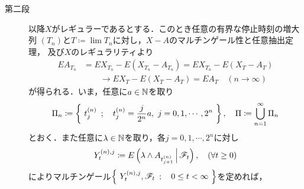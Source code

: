 \begin{prf}
\begin{description}
			\item[第二段]
				以降$X$がレギュラーであるとする．このとき任意の有界な停止時刻の増大列
				$(T_n)$と$T \coloneqq \lim T_n$に対し，$X-A$のマルチンゲール性と任意抽出定理，
				及び$X$のレギュラリティより
				\begin{align}
					EA_{T_n} &= EX_{T_n} - E(X_{T_n} - A_{T_n})
					= EX_{T_n} - E(X_T - A_T) \\
					&\qquad \longrightarrow EX_T - E(X_T - A_T)
					= EA_T
					\quad (n \longrightarrow \infty)
					\label{eq:chapter_1_theorem_4_14_1}
				\end{align}
				が得られる．いま，任意に$a \in \mathbb{N}$を取り
				\begin{align}
					\Pi_n \coloneqq 
					\Set{t^{(n)}_j}{t^{(n)}_j = \frac{j}{2^n}a,\ j=0,1,\cdots,2^n},
					\quad \Pi \coloneqq \bigcup_{n=1}^\infty \Pi_n
				\end{align}
				とおく．また任意に$\lambda \in \mathbb{N}$を取り，各$j = 0,1,\cdots,2^n$に対し
				\begin{align}
					Y^{(n),j}_t \coloneqq
					E\left( \lambda \wedge A_{t^{(n)}_{j+1}} \, \middle|\, \mathscr{F}_t \right),
					\quad (\forall t \geq 0)
				\end{align}
				によりマルチンゲール$\left\{\ Y^{(n),j}_t,\mathscr{F}_t\ \, ; \quad 0 \leq t < \infty\ \right\}$を定めれば，
				\begin{align}
					[0,\infty) \ni t \longmapsto EY^{(n),j}_t 
					= E\left(\lambda \wedge A_{t^{(n)}_{j+1}}\right)
				\end{align}
				と Theorem 3.13 より$RCLL$な修正$\tilde{Y}^{(n),j}$が存在する．このとき
				各$t \geq 0$で
				\begin{align}
					\int_A \tilde{Y}^{(n),j}_t\ dP 
					= \int_A \lambda \wedge A_{t^{(n)}_{j+1}}\ dP
					\leq \lambda P(A),
					\quad (\forall A \in \mathscr{F}_t)
				\end{align}
				となり，一方で各$t \in \left[t^{(n)}_j, t^{(n)}_{j+1} \right)$で
				\begin{align}
					\int_A \tilde{Y}^{(n),j}_t\ dP
					= \int_A \lambda \wedge A_{t^{(n)}_{j+1}}\ dP
					\geq \int_A \lambda \wedge A_t\ dP,
					\quad (\forall A \in \mathscr{F}_t) 
				\end{align}
				となるから，各$j$で
				\begin{align}
					E_j &\coloneqq \Set{\tilde{Y}^{(n),j}_t > \lambda}{\exists t \geq 0} 
						\cup \Set{\tilde{Y}^{(n),j}_t < \lambda \wedge A_t}{\exists t \in \left[t^{(n)}_j, t^{(n)}_{j+1} \right)} \\
					&= \left[ \bigcup_{r \in [0,\infty)\cap\Q}\left\{\tilde{Y}^{(n),j}_r > \lambda\right\} \right]

\end{align}
\end{description}
\end{prf}
